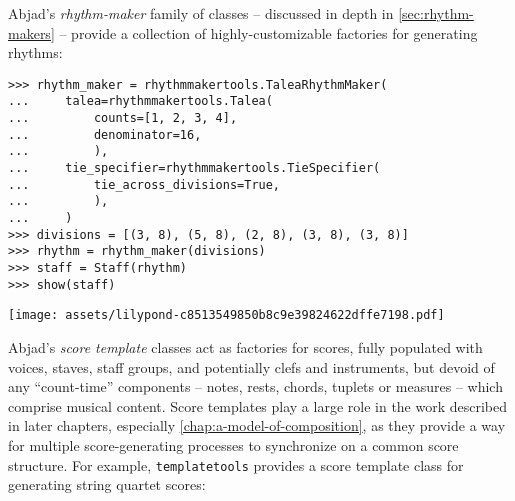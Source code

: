 \noindent Abjad's \emph{rhythm-maker} family of classes -- discussed in depth
in \autoref{sec:rhythm-makers} -- provide a collection of highly-customizable
factories for generating rhythms:

\begin{comment}
<abjad>
rhythm_maker = rhythmmakertools.TaleaRhythmMaker(
    talea=rhythmmakertools.Talea(
        counts=[1, 2, 3, 4],
        denominator=16,
        ),
    tie_specifier=rhythmmakertools.TieSpecifier(
        tie_across_divisions=True,
        ),
    )
divisions = [(3, 8), (5, 8), (2, 8), (3, 8), (3, 8)]
rhythm = rhythm_maker(divisions)
staff = Staff(rhythm)
show(staff)
</abjad>
\end{comment}

\begin{abjadbookoutput}
\begin{singlespacing}
\vspace{-0.5\baselineskip}
\begin{verbatim}
>>> rhythm_maker = rhythmmakertools.TaleaRhythmMaker(
...     talea=rhythmmakertools.Talea(
...         counts=[1, 2, 3, 4],
...         denominator=16,
...         ),
...     tie_specifier=rhythmmakertools.TieSpecifier(
...         tie_across_divisions=True,
...         ),
...     )
>>> divisions = [(3, 8), (5, 8), (2, 8), (3, 8), (3, 8)]
>>> rhythm = rhythm_maker(divisions)
>>> staff = Staff(rhythm)
>>> show(staff)
\end{verbatim}
\noindent\texttt{[image: assets/lilypond-c8513549850b8c9e39824622dffe7198.pdf]}
\end{singlespacing}
\end{abjadbookoutput}

\noindent Abjad's \emph{score template} classes act as factories for scores,
fully populated with voices, staves, staff groups, and potentially clefs and
instruments, but devoid of any \enquote{count-time} components -- notes, rests,
chords, tuplets or measures -- which comprise musical content. Score templates
play a large role in the work described in later chapters, especially
\autoref{chap:a-model-of-composition}, as they provide a way for multiple
score-generating processes to synchronize on a common score structure. For
example, \texttt{templatetools} provides a score template class for generating
string quartet scores:

\begin{comment}
<abjad>
score_template = templatetools.StringQuartetScoreTemplate()
score = score_template()
print(format(score))
</abjad>
\end{comment}

